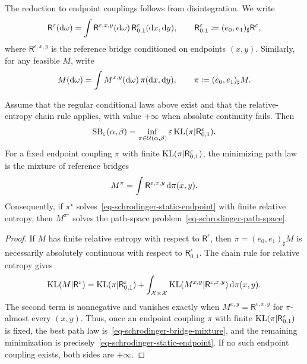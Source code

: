 The reduction to endpoint couplings follows from disintegration. We write
\[
	\mathsf R^\varepsilon(\mathrm{d}\omega)
	=
	\int \mathsf R^{\varepsilon,x,y}(\mathrm{d}\omega)\,
		\mathsf R^\varepsilon_{0,1}(\mathrm{d} x,\mathrm{d} y),
	\qquad
	\mathsf R^\varepsilon_{0,1}\coloneqq(e_0,e_1)_\sharp\mathsf R^\varepsilon,
\]
where $\mathsf R^{\epsilon,x,y}$ is the reference bridge conditioned on endpoints $(x,y)$. Similarly, for any feasible $M$, write
\[
	M(\mathrm{d}\omega)
	=
	\int M^{x,y}(\mathrm{d}\omega)\,\pi(\mathrm{d} x,\mathrm{d} y),
	\qquad
	\pi\coloneqq(e_0,e_1)_\sharp M.
\]

\begin{prop}\label{prop-schrodinger-endpoint-reduction}
	Assume that the regular conditional laws above exist and that the relative-entropy chain rule applies, with value $+\infty$ when absolute continuity fails. Then
	\begin{equation}\label{eq-schrodinger-static-endpoint}
		\mathrm{SB}_\varepsilon(\alpha,\beta)
		=
		\inf_{\pi\in\mathcal{U}(\alpha,\beta)}
		\varepsilon\operatorname{KL}(\pi|\mathsf R^\varepsilon_{0,1}).
	\end{equation}
	For a fixed endpoint coupling $\pi$ with finite $\operatorname{KL}(\pi|\mathsf R^\varepsilon_{0,1})$, the minimizing path law is the mixture of reference bridges
	\begin{equation}\label{eq-schrodinger-bridge-mixture}
		M^\pi
		=
		\int \mathsf R^{\varepsilon,x,y}\,\mathrm{d}\pi(x,y).
	\end{equation}
	Consequently, if $\pi^\star$ solves~\eqref{eq-schrodinger-static-endpoint} with finite relative entropy, then $M^{\pi^\star}$ solves the path-space problem~\eqref{eq-schrodinger-path-space}.
\end{prop}

\begin{proof}
	If $M$ has finite relative entropy with respect to $\mathsf R^\epsilon$, then $\pi=(e_0,e_1)_\sharp M$ is necessarily absolutely continuous with respect to $\mathsf R^\epsilon_{0,1}$. The chain rule for relative entropy gives
	\begin{equation}\label{eq-kl-chain-rule-path}
		\operatorname{KL}(M|\mathsf R^\varepsilon)
		=
		\operatorname{KL}(\pi|\mathsf R^\varepsilon_{0,1})
		+
		\int_{\mathcal{X}\times\mathcal{X}}
			\operatorname{KL}(M^{x,y}|\mathsf R^{\varepsilon,x,y})
			\,\mathrm{d}\pi(x,y).
	\end{equation}
	The second term is nonnegative and vanishes exactly when $M^{x,y}=\mathsf R^{\epsilon,x,y}$ for $\pi$-almost every $(x,y)$. Thus, once an endpoint coupling $\pi$ with finite $\operatorname{KL}(\pi|\mathsf R^\varepsilon_{0,1})$ is fixed, the best path law is~\eqref{eq-schrodinger-bridge-mixture}, and the remaining minimization is precisely~\eqref{eq-schrodinger-static-endpoint}. If no such endpoint coupling exists, both sides are $+\infty$.
\end{proof}


